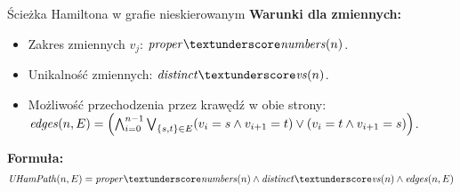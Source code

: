 \begin{frame}{Ścieżka Hamiltona w grafie nieskierowanym}
	\textbf{Warunki dla zmiennych:}
\begin{itemize}
	\item Zakres zmiennych $v_j$: $\propernumbers(n)$.
	\item Unikalność zmiennych: $\distinctvs(n)$.
	\item Możliwość przechodzenia przez krawędź w obie strony: ${\mathit{edges}}(n, E) = \left( \bigwedge_{i=0}^{n-1} \bigvee_{\{s,t\} \in E} (v_i = s \land v_{i+1} = t) \lor (v_i = t \land v_{i+1} = s) \right)$.
\end{itemize}
\vspace{10pt}
	
\textbf{Formuła:}
\begin{align*}
	\UHamPath(n, E) = \propernumbers(n) \land \distinctvs(n) \land \edges(n, E)
\end{align*}
\end{frame}